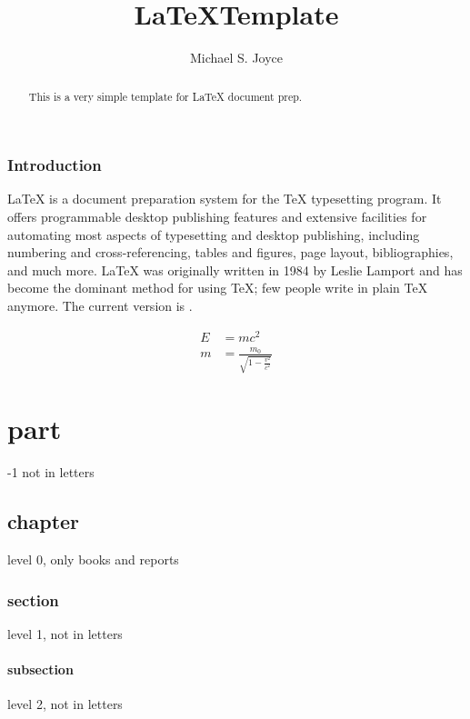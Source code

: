 \documentclass[12pt,letterpaper,draft]{article}
\title{\LaTeX Template}
\author{Michael S. Joyce}
\date{}
\begin{document}
  \maketitle
  
  \begin{abstract}
    This is a very simple template for \LaTeX{} document prep.
  \end{abstract}
  
  \tableofcontents

  \section{Introduction}
  \LaTeX{} is a document preparation system for the \TeX{} 
  typesetting program. It offers programmable desktop publishing 
  features and extensive facilities for automating most aspects of 
  typesetting and desktop publishing, including numbering and 
  cross-referencing, tables and figures, page layout, bibliographies, 
  and much more. \LaTeX{} was originally written in 1984 by Leslie 
  Lamport\cite{lamport94} and has become the dominant method for using \TeX; few 
  people write in plain \TeX{} anymore. The current version is 
  \LaTeXe.
 
  \begin{align}
    E &= mc^2                              \\
    m &= \frac{m_0}{\sqrt{1-\frac{v^2}{c^2}}}
  \end{align}

  \part{part}

  -1 	not in letters
  
  \chapter{chapter}

  level 0, only books and reports

  \section{section}
  level 1, not in letters
  \subsection{subsection}
  level 2, not in letters
\end{document}
